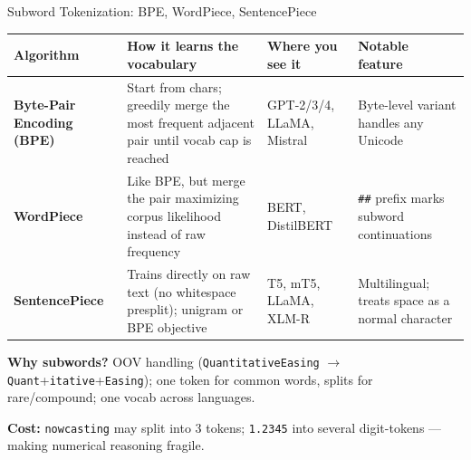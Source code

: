 \begin{frame}{Subword Tokenization: BPE, WordPiece, SentencePiece}
\begin{center}
\renewcommand{\arraystretch}{1.25}
\footnotesize
\begin{tabular}{|p{2.4cm}|p{4.0cm}|p{4.0cm}|p{3.0cm}|}
\hline
\textbf{Algorithm} & \textbf{How it learns the vocabulary} & \textbf{Where you see it} & \textbf{Notable feature} \\
\hline
\textbf{Byte-Pair Encoding (BPE)} & Start from chars; greedily merge the most frequent adjacent pair until vocab cap is reached & GPT-2/3/4, LLaMA, Mistral & Byte-level variant handles any Unicode \\
\hline
\textbf{WordPiece} & Like BPE, but merge the pair maximizing corpus likelihood instead of raw frequency & BERT, DistilBERT & \texttt{\#\#} prefix marks subword continuations \\
\hline
\textbf{SentencePiece} & Trains directly on raw text (no whitespace presplit); unigram or BPE objective & T5, mT5, LLaMA, XLM-R & Multilingual; treats space as a normal character \\
\hline
\end{tabular}
\end{center}

\smallskip
\textbf{Why subwords?} OOV handling (\texttt{QuantitativeEasing} $\to$ \texttt{Quant}+\texttt{itative}+\texttt{Easing}); one token for common words, splits for rare/compound; one vocab across languages.

\smallskip
\textbf{Cost:} \texttt{nowcasting} may split into 3 tokens; \texttt{1.2345} into several digit-tokens --- making numerical reasoning fragile.
\end{frame}

